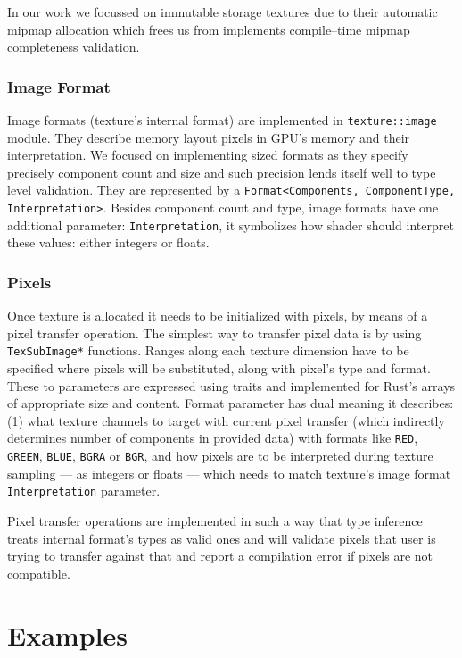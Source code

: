 In our work we focussed on immutable storage textures due to their automatic mipmap allocation which frees us from 
implements compile--time mipmap completeness validation.

\subsubsection{Image Format}

Image formats (texture's internal format) are implemented in \texttt{texture::image} module.
They describe memory layout pixels in GPU's memory and their interpretation.
We focused on implementing sized formats as they specify precisely component count and size 
and such precision lends itself well to type level validation.
They are represented by a \texttt{Format<Components, ComponentType, Interpretation>}.
Besides component count and type, image formats have one additional parameter: \texttt{Interpretation},
it symbolizes how shader should interpret these values: either integers or floats.

\subsubsection{Pixels}

Once texture is allocated it needs to be initialized with pixels, by means of a pixel transfer operation.
The simplest way to transfer pixel data is by using \texttt{TexSubImage*} functions.
Ranges along each texture dimension have to be specified where pixels will be substituted,
along with pixel's type and format.
These to parameters are expressed using traits and implemented for Rust's arrays of appropriate size and content.
Format parameter has dual meaning it describes: (1) what texture channels to target with current pixel transfer
(which indirectly determines number of components in provided data) with formats like \texttt{RED}, \texttt{GREEN}, \texttt{BLUE},
\texttt{BGRA} or \texttt{BGR}, and how pixels are to be interpreted during texture sampling --- as integers or floats --- which needs to match
texture's image format \texttt{Interpretation} parameter.

Pixel transfer operations are implemented in such a way that type inference treats internal format's types
as valid ones and will validate pixels that user is trying to transfer against that and report a compilation error
if pixels are not compatible.

\section{Examples}

